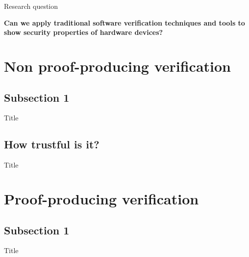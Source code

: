 \documentclass{beamer}
\begin{document}
\begin{frame}{Research question}
    \begin{center}
        \textbf{Can we apply traditional software verification techniques and tools to show security properties of hardware devices?}
    \end{center}
\end{frame}


\section{Non proof-producing verification}

\subsection{Subsection 1}

\begin{frame}{Title}
\end{frame}

\subsection{How trustful is it?}

\begin{frame}{Title}
\end{frame}

\section{Proof-producing verification}

\subsection{Subsection 1}

\begin{frame}{Title}
\end{frame}

\end{document}

